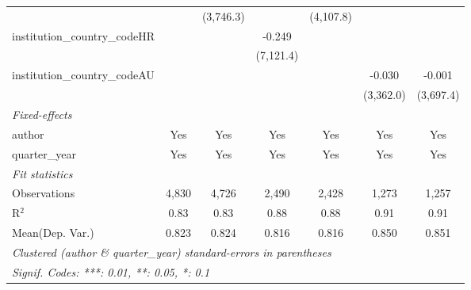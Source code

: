 \begin{tabular}{lcccccc}
                                         &                & (3,746.3)     &               & (4,107.8)     &                &   \\   
   institution\_country\_codeHR          &                &               & -0.249        &               &                &   \\   
                                         &                &               & (7,121.4)     &               &                &   \\   
   institution\_country\_codeAU          &                &               &               &               & -0.030         & -0.001\\   
                                         &                &               &               &               & (3,362.0)      & (3,697.4)\\   
   \midrule
   \emph{Fixed-effects}\\
   author                                & Yes            & Yes           & Yes           & Yes           & Yes            & Yes\\  
   quarter\_year                         & Yes            & Yes           & Yes           & Yes           & Yes            & Yes\\  
   \midrule
   \emph{Fit statistics}\\
   Observations                          & 4,830          & 4,726         & 2,490         & 2,428         & 1,273          & 1,257\\  
   R$^2$                                 & 0.83           & 0.83          & 0.88          & 0.88          & 0.91           & 0.91\\  
Mean(Dep. Var.) & 0.823 & 0.824 & 0.816 & 0.816 & 0.850 & 0.851 \\
   \midrule \midrule
   \multicolumn{7}{l}{\emph{Clustered (author \& quarter\_year) standard-errors in parentheses}}\\
   \multicolumn{7}{l}{\emph{Signif. Codes: ***: 0.01, **: 0.05, *: 0.1}}\\
\end{tabular}
\par\endgroup
